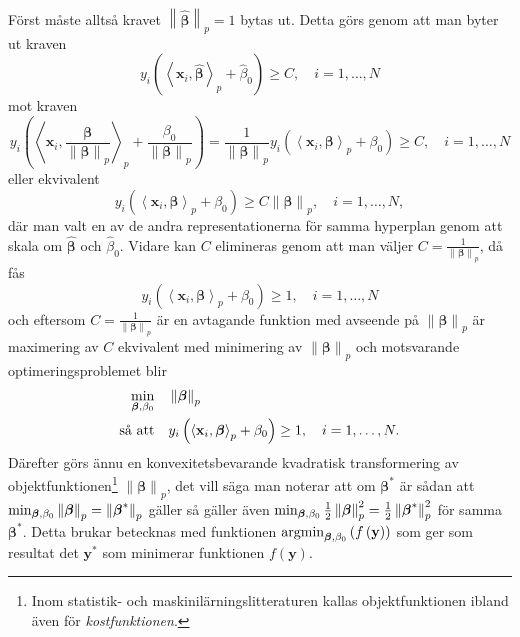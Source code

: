 \documentclass[a4paper, 12pt]{report}
\theoremstyle{definition}
\theoremstyle{remark}
\newcommand{\bfbeta}{{\boldsymbol{\beta}}}
\newcommand{\bfx}{\mathbf{x}}
\newcommand{\bfy}{\mathbf{y}}
\newcommand{\llangle}{\left\langle}
\newcommand{\rrangle}{\right\rangle}
\newcommand{\inner}[2]{\llangle #1, #2 \rrangle}
\begin{document}
Först måste alltså kravet $\left\|\widehat{\bfbeta}
\right\|_p=1$ bytas ut. Detta görs genom att man byter ut kraven
\begin{equation*}
y_i\left(\inner{\bfx_i}{\widehat{\bfbeta}}_p+\widehat{\beta}_0\right)\geq C,\quad i=1,\dots,N
\end{equation*}
mot kraven
\begin{equation*}
y_i\left(\inner{\bfx_i}{\frac{\bfbeta}{\left\|\bfbeta
\right\|_p}}_p+\frac{\beta_0}{\left\|\bfbeta
\right\|_p}\right) = 
\frac{1}{\left\|\bfbeta
\right\|_p}y_i\left(\inner{\bfx_i}{\bfbeta}_p+\beta_0\right)
 \geq C,\quad i=1,\dots,N
\end{equation*}
eller ekvivalent
\begin{equation*}
y_i\left(\inner{\bfx_i}{\bfbeta}_p+\beta_0\right)\geq C\left\|\bfbeta
\right\|_p,\quad i=1,\dots,N,
\end{equation*}
där man valt en av de andra representationerna för samma hyperplan genom att skala om $\widehat{\bfbeta}$ och $\widehat{\beta}_0$. Vidare kan $C$ elimineras genom att man väljer $C=\frac{1}{\left\|\bfbeta
\right\|_p}$, då fås
\begin{equation*}
y_i\left(\inner{\bfx_i}{\bfbeta}_p+\beta_0\right)\geq 1,\quad i=1,\dots,N
\end{equation*}
och eftersom $C=\frac{1}{\left\|\bfbeta
\right\|_p}$ är en avtagande funktion med avseende på $\left\|\bfbeta
\right\|_p$ är maximering av $C$ ekvivalent med minimering av $\left\|\bfbeta
\right\|_p$ och motsvarande optimeringsproblemet blir
\begin{equation*}%
\begin{aligned}
\operatornamewithlimits{min}_{\bfbeta,\beta_0} & & &\left\|\bfbeta
\right\|_p\\
\text{så att} & & &y_i\left(\inner{\bfx_i}{\bfbeta}_p+\beta_0\right)\geq 1,\quad i=1,\dots,N.
\end{aligned}
\end{equation*}
Därefter görs ännu en konvexitetsbevarande kvadratisk transformering av objektfunktionen\footnote{Inom statistik- och maskinilärningslitteraturen kallas objektfunktionen ibland även för \textit{kostfunktionen}.} $\left\|\bfbeta\right\|_p$, det vill säga man noterar att om $\bfbeta^*$ är sådan att $\operatornamewithlimits{min}_{\bfbeta,\beta_0} \left\|\bfbeta\right\|_p=\left\|\bfbeta^*\right\|_p$ gäller så gäller även $\operatornamewithlimits{min}_{\bfbeta,\beta_0} \frac{1}{2}\left\|\bfbeta\right\|_p^2=\frac{1}{2}\left\|\bfbeta^*\right\|_p^2$ för samma $\bfbeta^*$.
Detta brukar betecknas med funktionen $\operatornamewithlimits{argmin}_{\bfbeta,\beta_0} \left(f\left(\bfy\right)\right)$ som ger som resultat det $\bfy^*$ som minimerar funktionen $f\left(\bfy\right)$.
\end{document}
